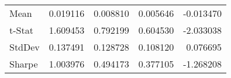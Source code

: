\begin{tabular}{lrrrr}
\toprule
\midrule
Mean & 0.019116 & 0.008810 & 0.005646 & -0.013470 \\
t-Stat & 1.609453 & 0.792199 & 0.604530 & -2.033038 \\
StdDev & 0.137491 & 0.128728 & 0.108120 & 0.076695 \\
Sharpe & 1.003976 & 0.494173 & 0.377105 & -1.268208 \\
\bottomrule
\end{tabular}
